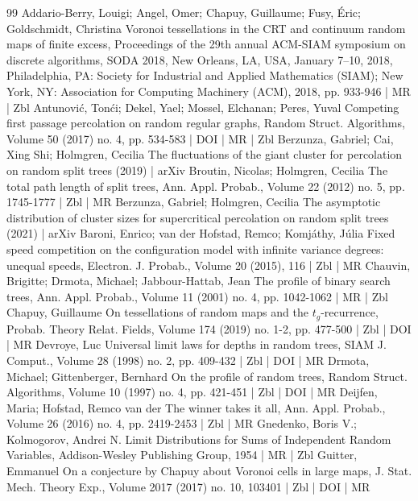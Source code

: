 \begin{thebibliography}{99}
 Addario-Berry, Louigi; Angel, Omer; Chapuy, Guillaume; Fusy, Éric; Goldschmidt, Christina Voronoi tessellations in the CRT and continuum random maps of finite excess, Proceedings of the 29th annual ACM-SIAM symposium on discrete algorithms, SODA 2018, New Orleans, LA, USA, January 7–10, 2018, Philadelphia, PA: Society for Industrial and Applied Mathematics (SIAM); New York, NY: Association for Computing Machinery (ACM), 2018, pp. 933-946 | MR | Zbl
 Antunović, Tonći; Dekel, Yael; Mossel, Elchanan; Peres, Yuval Competing first passage percolation on random regular graphs, Random Struct. Algorithms, Volume 50 (2017) no. 4, pp. 534-583 | DOI | MR | Zbl
 Berzunza, Gabriel; Cai, Xing Shi; Holmgren, Cecilia The fluctuations of the giant cluster for percolation on random split trees (2019) | arXiv
 Broutin, Nicolas; Holmgren, Cecilia The total path length of split trees, Ann. Appl. Probab., Volume 22 (2012) no. 5, pp. 1745-1777 | Zbl | MR
 Berzunza, Gabriel; Holmgren, Cecilia The asymptotic distribution of cluster sizes for supercritical percolation on random split trees (2021) | arXiv
 Baroni, Enrico; van der Hofstad, Remco; Komjáthy, Júlia Fixed speed competition on the configuration model with infinite variance degrees: unequal speeds, Electron. J. Probab., Volume 20 (2015), 116 | Zbl | MR
 Chauvin, Brigitte; Drmota, Michael; Jabbour-Hattab, Jean The profile of binary search trees, Ann. Appl. Probab., Volume 11 (2001) no. 4, pp. 1042-1062 | MR | Zbl
 Chapuy, Guillaume On tessellations of random maps and the $t_g$-recurrence, Probab. Theory Relat. Fields, Volume 174 (2019) no. 1-2, pp. 477-500 | Zbl | DOI | MR
 Devroye, Luc Universal limit laws for depths in random trees, SIAM J. Comput., Volume 28 (1998) no. 2, pp. 409-432 | Zbl | DOI | MR
 Drmota, Michael; Gittenberger, Bernhard On the profile of random trees, Random Struct. Algorithms, Volume 10 (1997) no. 4, pp. 421-451 | Zbl | DOI | MR
 Deijfen, Maria; Hofstad, Remco van der The winner takes it all, Ann. Appl. Probab., Volume 26 (2016) no. 4, pp. 2419-2453 | Zbl | MR
 Gnedenko, Boris V.; Kolmogorov, Andrei N. Limit Distributions for Sums of Independent Random Variables, Addison-Wesley Publishing Group, 1954 | MR | Zbl
 Guitter, Emmanuel On a conjecture by Chapuy about Voronoi cells in large maps, J. Stat. Mech. Theory Exp., Volume 2017 (2017) no. 10, 103401 | Zbl | DOI | MR

\end{thebibliography}
